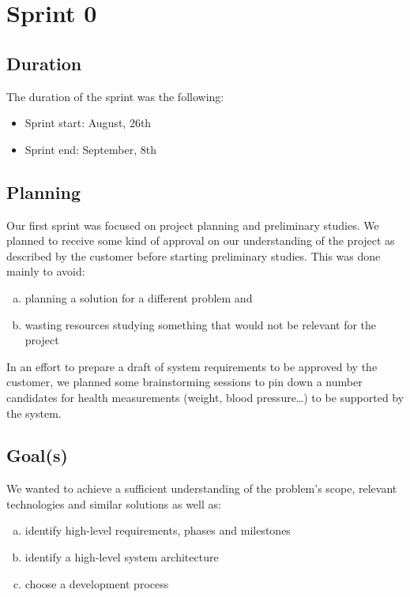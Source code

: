 
\chapter{Sprint 0}
\label{Sprint0}

\section{Duration}
The duration of the sprint was the following:
\begin{itemize}
\item Sprint start: August, 26th
\item Sprint end: September, 8th
\end{itemize}

\section{Planning}

Our first sprint was focused on project planning and preliminary studies.
We planned to receive some kind of approval on our understanding of the project
as described by the customer before starting preliminary studies. This was done mainly to avoid:
\begin{enumerate}[a)]
\item planning a solution for a different problem and
\item wasting resources studying something that would not be relevant for the project
\end{enumerate}
In an effort to prepare a draft of system requirements to be approved by the customer,
we planned some brainstorming sessions to pin down a number candidates for health measurements
(weight, blood pressure\ldots) to be supported by the system.

\section{Goal(s)}

We wanted to achieve a sufficient understanding of the problem's scope,
relevant technologies and similar solutions as well as:%
\begin{enumerate}[a)]
\item identify high-level requirements, phases and milestones
\item identify a high-level system architecture
\item choose a development process
\end{enumerate}

